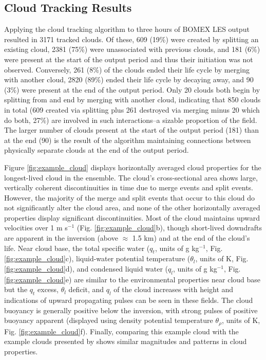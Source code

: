 \documentclass[acp]{copernicus}
\begin{document}
\subsection{Cloud Tracking Results}

Applying the cloud tracking algorithm to three hours of BOMEX LES output 
resulted in 3171 tracked clouds.  Of these, 609 (19\%) were created by 
splitting an existing cloud, 2381 (75\%) were unassociated with previous 
clouds, and 181 (6\%) were present at the start of the output period and thus 
their initiation was not observed.  Conversely, 261 (8\%) of the clouds ended 
their life cycle by merging with another cloud, 2820 (89\%) ended their 
life cycle by decaying away, and 90 (3\%) were present at the end of the output 
period.  Only 20 clouds both begin by splitting from and end by merging with 
another cloud, indicating that 850 clouds in total (609 created via splitting 
plus 261 destroyed via merging minus 20 which do both, 27\%) are involved in 
such interactions--a sizable proportion of the field.  The larger number of 
clouds present at the start of the output period (181) than at the end (90) is 
the result of the algorithm maintaining connections between physically separate 
clouds at the end of the output period.

Figure \ref{fig:example_cloud} displays horizontally averaged cloud properties 
for the longest-lived cloud in the ensemble.  The cloud's cross-sectional area 
shows large, vertically coherent discontinuities in time due to merge events 
and split events.  However, the majority of the merge and split events that 
occur to this cloud do not significantly alter the cloud area, and none of the 
other horizontally averaged properties display significant discontinuities.  
Most of the cloud maintains upward velocities over 1 m s$^{-1}$ (Fig. 
\ref{fig:example_cloud}b), though short-lived downdrafts are apparent in the 
inversion (above $\approx$ 1.5 km) and at the end of the cloud's life.  Near 
cloud base, the total specific water ($q_t$, units of g kg$^{-1}$, Fig. 
\ref{fig:example_cloud}c), liquid-water potential temperature ($\theta_l$, 
units of K, Fig. \ref{fig:example_cloud}d), and condensed liquid water 
($q_l$, units of g kg$^{-1}$, Fig. \ref{fig:example_cloud}e) are similar to 
the environmental properties near cloud base but the $q_t$ excess, $\theta_l$ 
deficit, and $q_l$ of the cloud increases with height and indications of 
upward propagating pulses can be seen in these fields.  The cloud buoyancy is 
generally positive below the inversion, with strong pulses of positive buoyancy 
apparent (displayed using density potential temperature $\theta_\rho$, units 
of K, Fig. \ref{fig:example_cloud}f).  Finally, comparing this example cloud 
with the example clouds presented by \citet[][figs. 4 and 5]{Heus2009} shows 
similar magnitudes and patterns in cloud properties.
\end{document}
